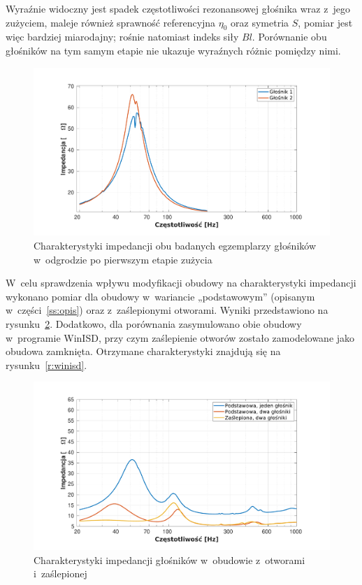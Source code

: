 \documentclass[12pt]{oska}
\begin{document}
	Wyraźnie widoczny jest spadek częstotliwości rezonansowej głośnika wraz z~jego zużyciem, maleje również sprawność referencyjna $\eta_0$ oraz symetria $S$, pomiar jest więc bardziej miarodajny; rośnie natomiast indeks siły $Bl$. Porównanie obu głośników na tym samym etapie nie ukazuje wyraźnych różnic pomiędzy nimi.
	
	\begin{figure}[!ht]
	\centering
	\includegraphics[width=.8\textwidth,trim={2cm .5cm 2cm 1cm},clip]{porownanie_glosnikow.pdf}
	\caption{Charakterystyki impedancji obu badanych egzemplarzy głośników w~odgrodzie po pierwszym etapie zużycia}
	\label{r:2glosniki}
	\end{figure}
	
	W~celu sprawdzenia wpływu modyfikacji obudowy na charakterystyki impedancji wykonano pomiar dla obudowy w~wariancie „podstawowym” (opisanym w~części~\ref{ss:opis}) oraz z~zaślepionymi otworami. Wyniki przedstawiono na rysunku~\ref{r:obudowa_otwory}. 
	Dodatkowo, dla porównania zasymulowano obie obudowy w~programie WinISD, przy czym zaślepienie otworów zostało zamodelowane jako obudowa zamknięta. Otrzymane charakterystyki znajdują się na rysunku~\ref{r:winisd}.
	
	\begin{figure}[!ht]
		\centering
		\includegraphics[width=.8\textwidth,trim={2cm .5cm 2cm 1cm},clip]{obudowa_otwory.pdf}
		\caption{Charakterystyki impedancji głośników w~obudowie z~otworami i~zaślepionej}
		\label{r:obudowa_otwory}
	\end{figure}
	
\end{document}
